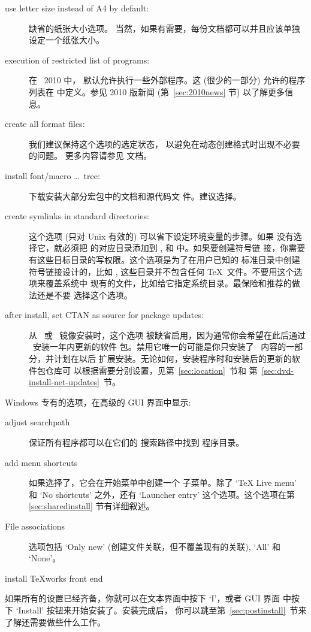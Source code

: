\documentclass{article}
\begin{document}
\begin{description}
\item[use letter size instead of A4 by default:] 缺省的纸张大小选项。
当然，如果有需要，每份文档都可以并且应该单独设定一个纸张大小。

\item[execution of restricted list of programs:] 在 \TL\ 2010 中，
默认允许执行一些外部程序。这 (很少的一部分) 允许的程序列表在
 中定义。参见 2010 版新闻 (第~\ref{sec:2010news} 节)
以了解更多信息。

\item[create all format files:] 我们建议保持这个选项的选定状态，
以避免在动态创建格式时出现不必要的问题。
更多内容请参见  文档。

\item[install font/macro \ldots\ tree:] 下载安装大部分宏包中的文档和源代码文
件。建议选择。

\item[create symlinks in standard directories:]
这个选项 (只对 Unix 有效的) 可以省下设定环境变量的步骤。如果
没有选择它，就必须把 \TL{} 的对应目录添加到 ,
 和  中。如果要创建符号链
接，你需要有这些目标目录的写权限。这个选项是为了在用户已知的
标准目录中创建符号链接设计的，比如 ,
这些目录并不包含任何 \TeX\ 文件。不要用这个选项来覆盖系统中
现有的文件，比如给它指定系统目录。最保险和推荐的做法还是不要
选择这个选项。

\item[after install, set CTAN as source for package updates:]
从 \DVD\ 或 \ISO\ 镜像安装时，这个选项
被缺省启用，因为通常你会希望在此后通过 \CTAN\ 安装一年内更新的软件
包。禁用它唯一的可能是你只安装了 \DVD\ 内容的一部分，并计划在以后
扩展安装。无论如何，安装程序时和安装后的更新的软件包仓库可
以根据需要分别设置，见第~\ref{sec:location}~节和
第~\ref{sec:dvd-install-net-updates}~节。
\end{description}
Windows 专有的选项，在高级的 GUI 界面中显示: 
\begin{description}
\item[adjust searchpath] 保证所有程序都可以在它们的
搜索路径中找到 \TL{} 程序目录。

\item[add menu shortcuts] 如果选择了，它会在开始菜单中创建一个 \TL{}
子菜单。除了 `TeX Live menu' 和 `No shortcuts' 之外，还有 `Launcher entry'
这个选项。这个选项在第 \ref{sec:sharedinstall} 节有详细叙述。

\item[File associations] 选项包括 `Only new' (创建文件关联，但不覆盖现有的关联),
`All' 和 `None'。

\item[install \TeX{}works front end]
\end{description}
如果所有的设置已经齐备，你就可以在文本界面中按下 `I'，或者 GUI 界面
中按下 `Install' 按钮来开始安装了。安装完成后，
你可以跳至第~\ref{sec:postinstall}~节来了解还需要做些什么工作。
\end{document}
